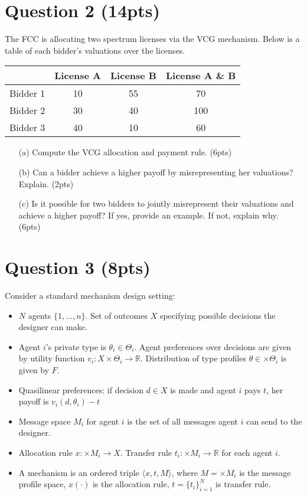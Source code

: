 \documentclass[10pt,a4paper]{article}
\begin{document}
\section*{Question 2 (14pts)}
  The FCC is allocating two spectrum licenses via the VCG mechanism. Below is a table of each bidder's valuations over the licenses.

  \begin{center}
    \begin{tabular}{|c|c|c|c|}
      \hline
      & \textbf{License A} & \textbf{License B} & \textbf{License A \& B} \\
      \hline
      Bidder 1 & 10 & 55 & 70 \\
      \hline
      Bidder 2 & 30 & 40 & 100 \\
      \hline
      Bidder 3 & 40 & 10 & 60 \\
      \hline
    \end{tabular}
  \end{center}

  \begin{enumerate}
      \item[(a)] Compute the VCG allocation and payment rule. (6pts)
      \item[(b)] Can a bidder achieve a higher payoff by misrepresenting her valuations? Explain. (2pts)
      \item[(c)] Is it possible for two bidders to jointly misrepresent their valuations and achieve a higher payoff? If yes, provide an example. If not, explain why. (6pts)
  \end{enumerate}

\section*{Question 3 (8pts)}
  Consider a standard mechanism design setting:
  \begin{itemize}
    \item $N$ agents $\{1, \ldots, n\}$. Set of outcomes $X$ specifying possible decisions the designer can make.
    \item Agent $i$'s private type is $\theta_i \in \Theta_i$. Agent preferences over decisions are given by utility function $v_i: X \times \Theta_i \rightarrow \mathbb{R}$. Distribution of type profiles $\theta \in \times\Theta_i$ is given by $F$.
    \item Quasilinear preferences: if decision $d \in X$ is made and agent $i$ pays $t$, her payoff is $v_i(d, \theta_i)-t$
    \item Message space $M_i$ for agent $i$ is the set of all messages agent $i$ can send to the designer.
    \item Allocation rule $x : \times M_i \rightarrow X$. Transfer rule $t_i: \times M_i \rightarrow \mathbb{R}$ for each agent $i$.
    \item A mechanism is an ordered triple $\langle x, t, M \rangle$, where $M = \times M_i$ is the message profile space, $x(\cdot)$ is the allocation rule, $t = \{t_i\}_{i=1}^N$ is transfer rule.
  \end{itemize}
\end{document}
